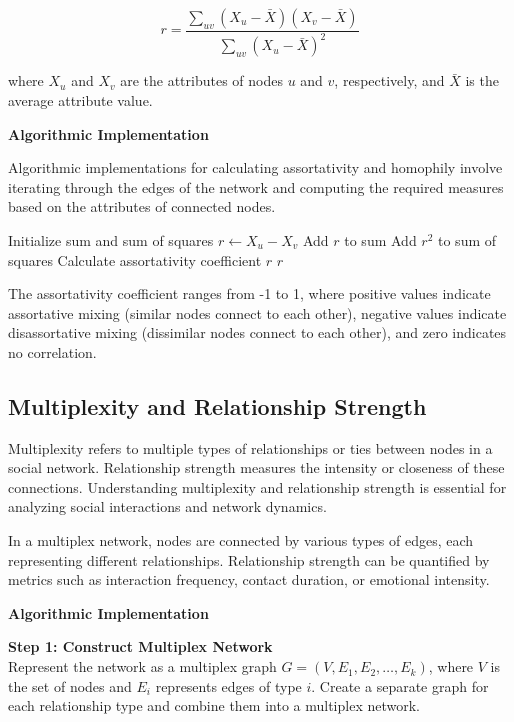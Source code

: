 \documentclass[12pt]{book} %
\begin{document}
\[ r = \frac{\sum_{uv} (X_u - \bar{X})(X_v - \bar{X})}{\sum_{uv} (X_u - \bar{X})^2} \]

where \(X_u\) and \(X_v\) are the attributes of nodes \(u\) and \(v\), respectively, and \(\bar{X}\) is the average attribute value.

\textbf{Algorithmic Implementation}

Algorithmic implementations for calculating assortativity and homophily involve iterating through the edges of the network and computing the required measures based on the attributes of connected nodes.

\begin{algorithm}[H]
\caption{Assortativity Calculation}\label{alg:assortativity}
\begin{algorithmic}[1]
    \State Initialize sum and sum of squares
        \State $r \gets X_u - X_v$
        \State Add $r$ to sum
        \State Add $r^2$ to sum of squares
    \EndFor
    \State Calculate assortativity coefficient $r$
    \State \Return $r$
\EndFunction
\end{algorithmic}
\end{algorithm}
\FloatBarrier

The assortativity coefficient ranges from -1 to 1, where positive values indicate assortative mixing (similar nodes connect to each other), negative values indicate disassortative mixing (dissimilar nodes connect to each other), and zero indicates no correlation.

\subsection{Multiplexity and Relationship Strength}

Multiplexity refers to multiple types of relationships or ties between nodes in a social network. Relationship strength measures the intensity or closeness of these connections. Understanding multiplexity and relationship strength is essential for analyzing social interactions and network dynamics.

In a multiplex network, nodes are connected by various types of edges, each representing different relationships. Relationship strength can be quantified by metrics such as interaction frequency, contact duration, or emotional intensity.

\textbf{Algorithmic Implementation}

\textbf{Step 1: Construct Multiplex Network} \\
Represent the network as a multiplex graph \(G = (V, E_1, E_2, \ldots, E_k)\), where \(V\) is the set of nodes and \(E_i\) represents edges of type \(i\). Create a separate graph for each relationship type and combine them into a multiplex network.
\end{document}
